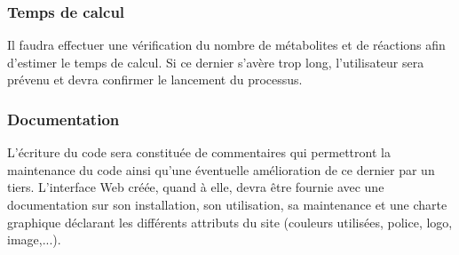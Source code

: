 \subsubsection{Temps de calcul}
Il faudra effectuer une vérification du nombre de métabolites et de réactions afin d'estimer le temps de calcul. Si ce dernier s'avère trop long, l'utilisateur sera prévenu et devra confirmer le lancement du processus. 

\subsubsection{Documentation}
L'écriture du code sera constituée de commentaires qui permettront la maintenance du code ainsi qu'une éventuelle amélioration de ce dernier par un tiers.
L'interface Web créée, quand à elle, devra être fournie avec une documentation sur son installation, son utilisation, sa maintenance et une charte graphique déclarant les différents attributs du site (couleurs utilisées, police, logo, image,...).
